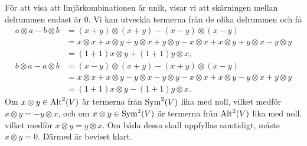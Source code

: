 För att visa att linjärkombinationen är unik, visar vi att skärningen mellan delrummen endast är $0$. Vi kan utveckla termerna från de olika delrummen och få
\begin{align*}
	a\otimes a - b\otimes b &= (x + y)\otimes (x + y) - (x - y)\otimes (x - y) \\
	                        &= x\otimes x + x\otimes y + y\otimes x + y\otimes y - x\otimes x + x\otimes y + y\otimes x - y\otimes y \\
	                        &= (1 + 1)x\otimes y + (1 + 1)y\otimes x, \\
	b\otimes a - a\otimes b &= (x - y)\otimes (x + y) - (x + y)\otimes (x - y) \\
	                        &= x\otimes x + x\otimes y - y\otimes x - y\otimes y - x\otimes x + x\otimes y - y\otimes x + y\otimes y \\
	                        &= (1 + 1)x\otimes y - (1 + 1)y\otimes x.
\end{align*}
Om $x\otimes y\in\Alt[2]{V}$ är termerna från $\Sym[2]{V}$ lika med noll, vilket medför $x\otimes y = -y\otimes x$, och om $x\otimes y\in\Sym[2]{V}$ är termerna från $\Alt[2]{V}$ lika med noll, vilket medför $x\otimes y = y\otimes x$. Om båda dessa skall uppfyllas samtidigt, måste $x\otimes y = 0$. Därmed är beviset klart.